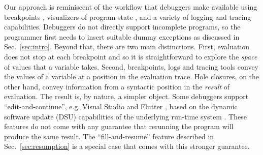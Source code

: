 
Our approach is reminiscent of the workflow that debuggers make available using breakpoints \cite{fitzgerald2008debugging,DBLP:journals/jfp/TolmachA95}, visualizers of program state \cite{Nelson2017,Guo13}, and a variety of logging and tracing capabilities.
%
Debuggers do not directly support incomplete programs, so the programmer first needs to insert suitable dummy exceptions as discussed in Sec.~\ref{sec:intro}.
%
Beyond that, there are two main distinctions. First, evaluation does not stop at each breakpoint and so it is straightforward to explore the \emph{space} of values that a variable takes. Second, breakpoints, logs and tracing tools convey the values of a variable at a position in the evaluation trace. Hole closures, on the other hand, convey information from a syntactic position in the \emph{result} of evaluation. The result is, by nature, a simpler object. %
Some debuggers support ``edit-and-continue'', e.g. Visual Studio \cite{VSEditAndContinue} and Flutter \cite{flutter}, based on the dynamic software update (DSU) capabilities of the underlying run-time system \cite{DBLP:journals/toplas/StoyleHBSN07,DBLP:conf/vstte/HaydenMHFF12,DBLP:journals/toplas/HicksN05}. These features do not come with any guarantee that rerunning the program will produce the same result. The ``fill-and-resume'' feature described in Sec.~\ref{sec:resumption} is a special case that comes with this stronger guarantee.

